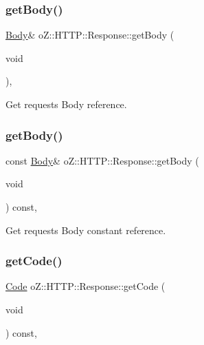 \subsubsection{\texorpdfstring{getBody()}{getBody()}\hspace{0.1cm}{\footnotesize\ttfamily [1/2]}}
{\footnotesize\ttfamily \mbox{\hyperlink{namespaceo_z_1_1_h_t_t_p_a270c38b9f9b6228ce430fda6d5b150d6}{Body}}\& o\+Z\+::\+H\+T\+T\+P\+::\+Response\+::get\+Body (\begin{DoxyParamCaption}\item[{void}]{ }\end{DoxyParamCaption})\hspace{0.3cm}{\ttfamily [inline]}, {\ttfamily [noexcept]}}



Get request\textquotesingle{}s Body reference. 

\mbox{\label{classo_z_1_1_h_t_t_p_1_1_response_a5cae2054ce103c55d54c41da4f1e8962}} 
\subsubsection{\texorpdfstring{getBody()}{getBody()}\hspace{0.1cm}{\footnotesize\ttfamily [2/2]}}
{\footnotesize\ttfamily const \mbox{\hyperlink{namespaceo_z_1_1_h_t_t_p_a270c38b9f9b6228ce430fda6d5b150d6}{Body}}\& o\+Z\+::\+H\+T\+T\+P\+::\+Response\+::get\+Body (\begin{DoxyParamCaption}\item[{void}]{ }\end{DoxyParamCaption}) const\hspace{0.3cm}{\ttfamily [inline]}, {\ttfamily [noexcept]}}



Get request\textquotesingle{}s Body constant reference. 

\mbox{\label{classo_z_1_1_h_t_t_p_1_1_response_aa2191a167fe53e8f0a8c2e64393cede0}} 
\subsubsection{\texorpdfstring{getCode()}{getCode()}}
{\footnotesize\ttfamily \mbox{\hyperlink{namespaceo_z_1_1_h_t_t_p_acd43703151305f79b1e2f42e98ee8199}{Code}} o\+Z\+::\+H\+T\+T\+P\+::\+Response\+::get\+Code (\begin{DoxyParamCaption}\item[{void}]{ }\end{DoxyParamCaption}) const\hspace{0.3cm}{\ttfamily [inline]}, {\ttfamily [noexcept]}}



